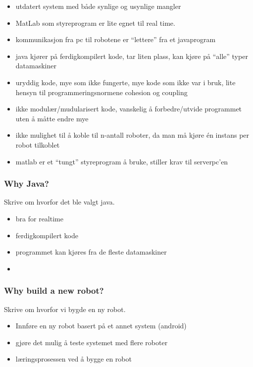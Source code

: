 \begin{itemize}
    \item utdatert system med både synlige og usynlige mangler
    \item MatLab som styreprogram er lite egnet til real time.
    \item kommunikasjon fra pc til robotene er ``lettere'' fra et javaprogram
    \item java kjører på ferdigkompilert kode, tar liten plass, kan kjøre på ``alle'' typer datamaskiner
    \item uryddig kode, mye som ikke fungerte, mye kode som ikke var i bruk, lite hensyn til programmeringsnormene cohesion og coupling
    \item ikke modulær/mudularisert kode, vanskelig å forbedre/utvide programmet uten å måtte endre mye
    \item ikke mulighet til å koble til n-antall roboter, da man må kjøre én instans per robot tilkoblet
    \item matlab er et ``tungt'' styreprogram å bruke, stiller krav til serverpc'en
\end{itemize}

\subsubsection{Why Java?}
Skrive om hvorfor det ble valgt java.

\begin{itemize}
    \item bra for realtime
    \item ferdigkompilert kode
    \item programmet kan kjøres fra de fleste datamaskiner
    \item 
\end{itemize}

\subsubsection{Why build a new robot?}
Skrive om hvorfor vi bygde en ny robot.

\begin{itemize}
    \item Innføre en ny robot basert på et annet system (android)
    \item gjøre det mulig å teste systemet med flere roboter
    \item læringsprosessen ved å bygge en robot
\end{itemize}

